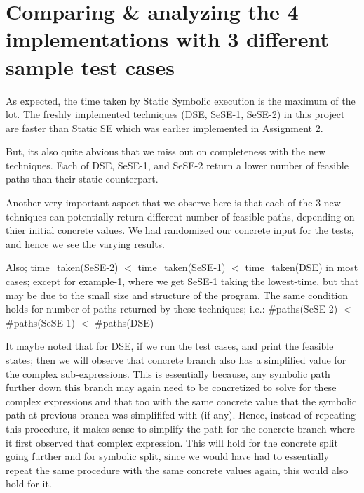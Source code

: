 \documentclass[11pt]{llncs}
\begin{document}
\section{Comparing \& analyzing the 4 implementations with 3 different sample test cases} \label{Comparing and analyzing the 3 implementations with some sample test cases}
	\vspace{-2mm}

	As expected, the time taken by Static Symbolic execution is the maximum of the lot. The freshly implemented techniques (DSE, SeSE-1, SeSE-2) in this project are faster than Static SE which was earlier implemented in Assignment 2. 

	\vspace{2mm}

	But, its also quite abvious that we miss out on completeness with the new techniques. Each of DSE, SeSE-1, and SeSE-2 return a lower number of feasible paths than their static counterpart.

	\vspace{2mm}

	Another very important aspect that we observe here is that each of the 3 new tehniques can potentially return different number of feasible paths, depending on thier initial concrete values. We had randomized our concrete input for the tests, and hence we see the varying results.

	\vspace{2mm}

	Also; time\_taken(SeSE-2) $<$  time\_taken(SeSE-1) $<$  time\_taken(DSE) in most cases; except for example-1, where we get SeSE-1 taking the lowest-time, but that may be due to the small size and structure of the program. The same condition holds for number of paths returned by these techniques; i.e.: \#paths(SeSE-2) $<$  \#paths(SeSE-1) $<$ \#paths(DSE)
	
   	 \vspace{2mm}

	It maybe noted that for DSE, if we run the test cases, and print the feasible states; then we will observe that concrete branch also has a simplified value for the complex sub-expressions. This is essentially because, any symbolic path further down this branch may again need to be concretized to solve for these complex expressions and that too with the same concrete value that the symbolic path at previous branch was simplififed with (if any). Hence, instead of repeating this procedure, it makes sense to simplify the path for the concrete branch where it first observed that complex expression. This will hold for the concrete split going further and for symbolic split, since we would have had to essentially repeat the same procedure with the same concrete values again, this would also hold for it.
	
\end{document}
